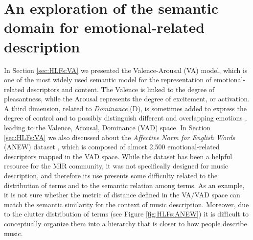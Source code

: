 %

\section{An exploration of the semantic domain for emotional-related description}\label{sec:HLFs:ANEW}
In Section \ref{sec:HLFs:VA} we presented the Valence-Arousal (VA) model, which is one of the most widely used semantic model for the representation of emotional-related descriptors and content. The Valence is linked to the degree of pleasantness, while the Arousal represents the degree of excitement, or activation. A third dimension, related to \textit{Dominance} (D), is sometimes added to express the degree of control and to possibly distinguish different and overlapping emotions \cite{Cowie2012, Scherer2004}, leading to the Valence, Arousal, Dominance (VAD) space. In Section \ref{sec:HLFs:VA} we also discussed about the \textit{Affective Norm for English Words} (ANEW) dataset \cite{Bradley1999}, which is composed of almost 2,500 emotional-related descriptors mapped in the VAD space. While the dataset has been a helpful resource for the MIR community, it was not specifically designed for music description, and therefore its use presents some difficulty related to the distribution of terms and to the semantic relation among terms. As an example, it is not sure whether the metric of distance defined in the VA/VAD space can match the semantic similarity for the context of music description. Moreover, due to the clutter distribution of terms (see Figure \ref{fig:HLFs:ANEW}) it is difficult to conceptually organize them into a  hierarchy that is closer to how people describe music.




